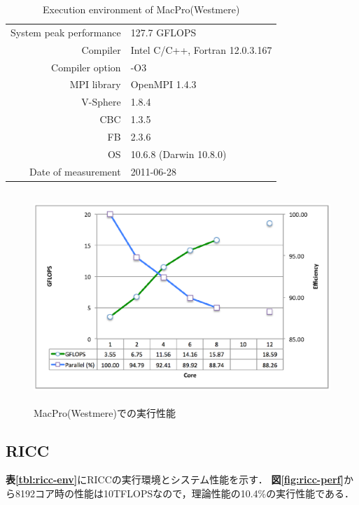 \begin{table}[htdp]
\caption{Execution environment of MacPro(Westmere)}
\small
\begin{center}
\begin{tabular}{rl}\toprule
System peak performance & 127.7 GFLOPS\\
Compiler & Intel C/C++, Fortran 12.0.3.167\\
Compiler option & -O3\\
MPI library & OpenMPI 1.4.3\\
V-Sphere & 1.8.4\\
CBC & 1.3.5\\
FB & 2.3.6\\
OS & 10.6.8 (Darwin 10.8.0)\\
Date of measurement & 2011-06-28\\ \bottomrule
\end{tabular}
\end{center}
\label{tbl:macpro-env-westmere}
\end{table}

\begin{figure}[htdp]
\begin{center}
\includegraphics[height=8cm,clip]{mac-westmere.eps}
\end{center}
\caption{MacPro(Westmere)での実行性能}
\label{fig:mac-westmere-perf}
\end{figure}

\pagebreak
%
\subsection{RICC}

\textbf{表\ref{tbl:ricc-env}}にRICCの実行環境とシステム性能を示す．
\textbf{図\ref{fig:ricc-perf}}から8192コア時の性能は10TFLOPSなので，理論性能の10.4\%の実行性能である．


